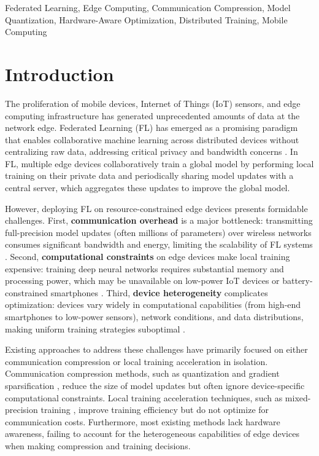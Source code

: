 \documentclass[journal]{IEEEtran}
\begin{document}
\begin{IEEEkeywords}
Federated Learning, Edge Computing, Communication Compression, Model Quantization, Hardware-Aware Optimization, Distributed Training, Mobile Computing
\end{IEEEkeywords}

\IEEEpeerreviewmaketitle

\section{Introduction}
\label{sec:introduction}

The proliferation of mobile devices, Internet of Things (IoT) sensors, and edge computing infrastructure has generated unprecedented amounts of data at the network edge. Federated Learning (FL) has emerged as a promising paradigm that enables collaborative machine learning across distributed devices without centralizing raw data, addressing critical privacy and bandwidth concerns \cite{mcmahan2017communication}. In FL, multiple edge devices collaboratively train a global model by performing local training on their private data and periodically sharing model updates with a central server, which aggregates these updates to improve the global model.

However, deploying FL on resource-constrained edge devices presents formidable challenges. First, \textbf{communication overhead} is a major bottleneck: transmitting full-precision model updates (often millions of parameters) over wireless networks consumes significant bandwidth and energy, limiting the scalability of FL systems \cite{konevcny2016federated}. Second, \textbf{computational constraints} on edge devices make local training expensive: training deep neural networks requires substantial memory and processing power, which may be unavailable on low-power IoT devices or battery-constrained smartphones \cite{li2020federated}. Third, \textbf{device heterogeneity} complicates optimization: devices vary widely in computational capabilities (from high-end smartphones to low-power sensors), network conditions, and data distributions, making uniform training strategies suboptimal \cite{karimireddy2020scaffold}.

Existing approaches to address these challenges have primarily focused on either communication compression or local training acceleration in isolation. Communication compression methods, such as quantization \cite{alistarh2017qsgd} and gradient sparsification \cite{wangni2018gradient}, reduce the size of model updates but often ignore device-specific computational constraints. Local training acceleration techniques, such as mixed-precision training \cite{micikevicius2018mixed}, improve training efficiency but do not optimize for communication costs. Furthermore, most existing methods lack hardware awareness, failing to account for the heterogeneous capabilities of edge devices when making compression and training decisions.
\end{document}
